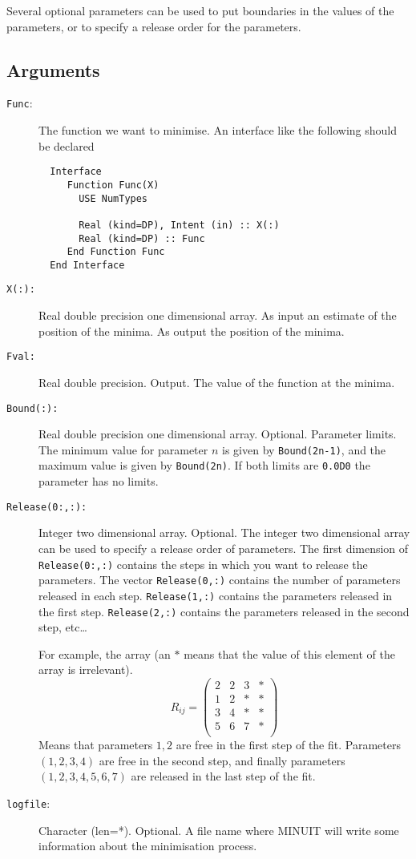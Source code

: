 Several optional parameters can be used to put boundaries in the
values of the parameters, or to specify a release order for the
parameters. 

\subsection{Arguments}

\begin{description}
\item[\texttt{Func}:]  The function we want to minimise. An interface
  like the following should be declared
\begin{verbatim}
  Interface
     Function Func(X)
       USE NumTypes
       
       Real (kind=DP), Intent (in) :: X(:)
       Real (kind=DP) :: Func
     End Function Func
  End Interface
\end{verbatim}
\item[\texttt{X(:): }] Real double precision one dimensional array. As
  input an estimate of 
  the position of the minima. As output the position of the minima.
\item[\texttt{Fval:}] Real double precision. Output. The value of the
  function at the minima.
\item[\texttt{Bound(:): }] Real double precision one dimensional
  array. Optional. Parameter limits. The minimum value for parameter
  $n$ is given by \texttt{Bound(2n-1)}, and the maximum value is given
  by \texttt{Bound(2n)}. If both limits are \texttt{0.0D0} the
  parameter has no limits.
\item[\texttt{Release(0:,:):}] Integer two dimensional
  array. Optional. The integer two dimensional array can be used to
  specify a release order of parameters. The first dimension of
  \texttt{Release(0:,:)} contains the steps in which you want to
  release the parameters. The vector \texttt{Release(0,:)} contains
  the number of parameters released in each
  step. \texttt{Release(1,:)} contains the parameters released in the
  first step. \texttt{Release(2,:)} contains the parameters released in the
  second step, etc\dots

  For example, the array (an $*$ means that the value of this element
  of the array is irrelevant).
  \begin{equation}
    R_{ij} = \left(
      \begin{array}{cccc}
        2 & 2 & 3 & * \\
        1 & 2 & * & * \\
        3 & 4 & * & * \\
        5 & 6 & 7 & * \\
      \end{array}
      \right)
  \end{equation}
  Means that parameters $1,2$ are free in the first step of the
  fit. Parameters $(1,2,3,4)$ are free in the second step, and finally
  parameters $(1,2,3,4,5,6,7)$ are released in the last step of the
  fit.
\item[\texttt{logfile}: ] Character (len=*). Optional. A file name
  where MINUIT will write some information about the minimisation
  process. 
\end{description}

